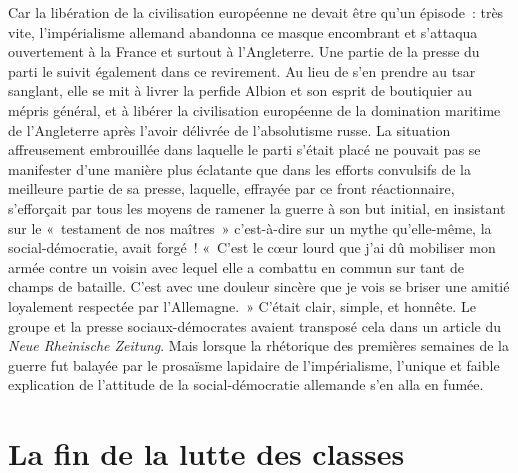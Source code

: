 \documentclass[french,twoside]{book} %
\begin{document}
Car la libération de la civilisation européenne ne devait être qu’un épisode : très vite, l’impérialisme allemand abandonna ce masque encombrant et s’attaqua ouvertement à la France et surtout à l’Angleterre. Une partie de la presse du parti le suivit également dans ce revirement. Au lieu de s’en prendre au tsar sanglant, elle se mit à livrer la perfide Albion et son esprit de boutiquier au mépris général, et à libérer la civilisation européenne de la domination maritime de l’Angleterre après l’avoir délivrée de l’absolutisme russe. La situation affreusement embrouillée dans laquelle le parti s’était placé ne pouvait pas se manifester d’une manière plus éclatante que dans les efforts convulsifs de la meilleure partie de sa presse, laquelle, effrayée par ce front réactionnaire, s’efforçait par tous les moyens de ramener la guerre à son but initial, en insistant sur le « testament de nos maîtres » c’est-à-dire sur un mythe qu’elle-même, la social-démocratie, avait forgé ! « C'est le cœur lourd que j’ai dû mobiliser mon armée contre un voisin avec lequel elle a combattu en commun sur tant de champs de bataille. C'est avec une douleur sincère que je vois se briser une amitié loyalement respectée par l’Allemagne. » C'était clair, simple, et honnête. Le groupe et la presse sociaux-démocrates avaient transposé cela dans un article du \emph{Neue Rheinische Zeitung}. Mais lorsque la rhétorique des premières semaines de la guerre fut balayée par le prosaïsme lapidaire de l’impérialisme, l’unique et faible explication de l’attitude de la social-démocratie allemande s’en alla en fumée.
\section[{La fin de la lutte des classes}]{La fin de la lutte des classes}\renewcommand{\leftmark}{La fin de la lutte des classes}
\end{document}
